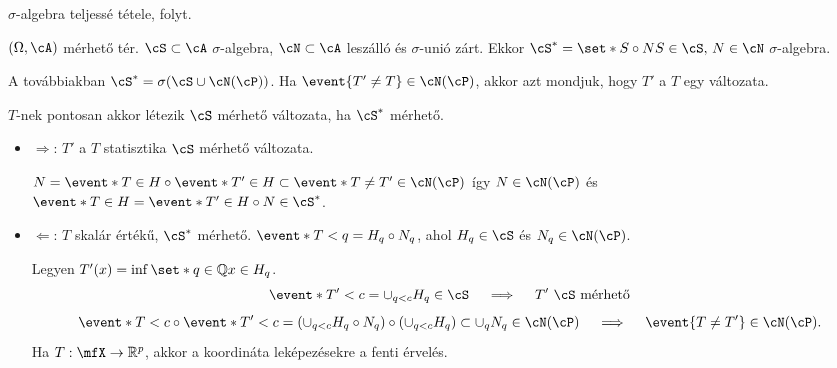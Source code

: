 \documentclass[aspectratio=169,notheorems,9pt,\option]{beamer}
\begin{document}
\begin{frame}{$\sigma$-algebra teljessé tétele, folyt.}
  \begin{proposition}
    $(\Omega,\cA)$ mérhető tér. $\cS\subset\cA$ $\sigma$-algebra, 
    $\cN\subset\cA$ leszálló és $\sigma$-unió zárt. Ekkor
    $\cS^*=\set*{S\circ N}{S\in\cS,\,N\in\cN}$ $\sigma$-algebra.
  \end{proposition}
  
  A továbbiakban %
  $\cS^*=\sigma(\cS\cup\cN(\cP))$.
  Ha $\event{T'\neq T}\in\cN(\cP)$, %
  akkor %
  azt mondjuk, hogy 
  $T'$ a $T$ egy változata.
  \begin{proposition}
    $T$-nek pontosan akkor létezik $\cS$ mérhető változata, ha $\cS^*$ mérhető.
  \end{proposition}
  \begin{itemize}
    \item $\Rightarrow$: $T'$  a $T$ statisztika $\cS$ mérhető változata.
     
    $N=\event*{T\in H}\circ\event*{T'\in H}\subset \event*{T\neq T'}\in\cN(\cP)$ 
    így $N\in\cN(\cP)$ 
    és $\event*{T\in H}=\event*{T'\in H}\circ N\in \cS^*$. 
    \item $\Leftarrow$: $T$  skalár értékű, $\cS^*$ mérhető. $\event*{T<q}=H_q\circ N_q$, 
    ahol $H_q\in\cS$ és $N_q\in\cN(\cP)$.

    \continue
    Legyen $T'(x)=\inf\set*{q\in\Q}{x\in H_q}$.
    \pause
    \begin{displaymath}
      \event*{T'<c}=\cup_{q<c} H_q\in\cS\quad\implies\quad \text{$T'$ $\cS$ mérhető}
    \end{displaymath} 
    \pause
    \begin{displaymath}
      \event*{T<c}\circ\event*{T'<c}=(\cup_{q<c}H_q\circ N_q)\circ(\cup_{q<c}H_q)
      \subset\cup_q N_q\in\cN(\cP) \quad\implies\quad\event{T\neq T'}\in\cN(\cP).
    \end{displaymath}
    \pause
    Ha $T:\mfX\to\real^p$, akkor a koordináta leképezésekre a fenti érvelés.
  \end{itemize}  
\end{frame}
\end{document}
